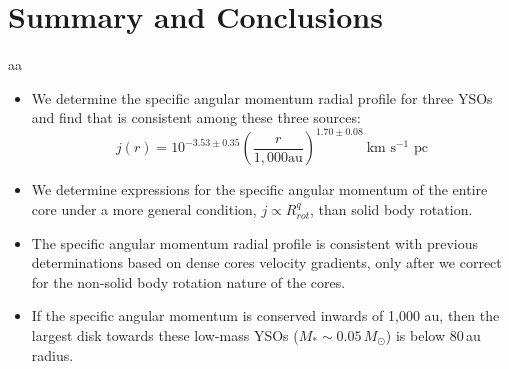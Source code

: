 \section{Summary and Conclusions}
aa
\begin{itemize}
\item We determine the specific angular momentum radial profile for three YSOs and 
find that is consistent among these three sources:
\[ j(r) = 10^{-3.53\pm0.35}\left( \frac{r}{1,000 \textrm{au}}\right)^{1.70\pm 0.08}~\textrm{km s$^{-1}$ pc}\]
\item We determine expressions for the specific angular momentum of the entire core under 
a more general condition, $j \propto R_{rot}^q$, than solid body rotation.
\item The specific angular momentum radial profile is consistent with previous determinations 
based on dense cores velocity gradients, only after we correct for the non-solid body rotation 
nature of the cores.
\item If the specific angular momentum is conserved inwards of 1,000 au, then the 
largest disk towards these low-mass YSOs ($M_*\sim 0.05\,M_\odot$) is below 80\,au radius.
\end{itemize}
